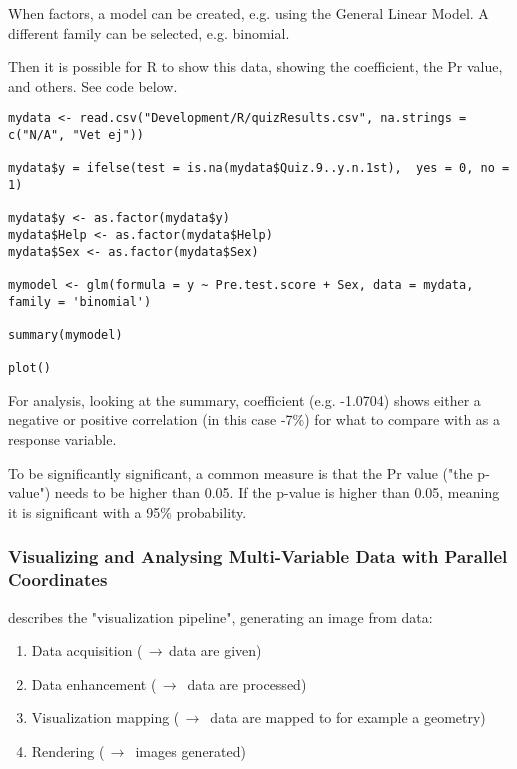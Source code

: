 When factors, a model can be created, e.g. using the General Linear Model. A different family can be selected, e.g. binomial.

Then it is possible for R to show this data, showing the coefficient, the Pr value, and others. See code below.

\begin{verbatim}
mydata <- read.csv("Development/R/quizResults.csv", na.strings = c("N/A", "Vet ej"))

mydata$y = ifelse(test = is.na(mydata$Quiz.9..y.n.1st),  yes = 0, no = 1)

mydata$y <- as.factor(mydata$y)
mydata$Help <- as.factor(mydata$Help)
mydata$Sex <- as.factor(mydata$Sex)

mymodel <- glm(formula = y ~ Pre.test.score + Sex, data = mydata, family = 'binomial')

summary(mymodel)

plot()
\end{verbatim}

For analysis, looking at the summary, coefficient (e.g. -1.0704) shows either a negative or positive correlation (in this case -7\%) for what to compare with as a response variable.

To be significantly significant, a common measure is that the Pr value ("the p-value") needs to be higher than 0.05. If the p-value is higher than 0.05, meaning it is significant with a 95\% probability.

\subsubsection{Visualizing and Analysing Multi-Variable Data with Parallel Coordinates}

\cite{timo-ropinski-liu} describes the "visualization pipeline", generating an image from data:

\begin{enumerate}
\item Data acquisition ($\,\to\,$data are given)
\item Data enhancement ($\,\to\,$ data are processed)
\item Visualization mapping ($\,\to\,$ data are mapped to for example a geometry)
\item Rendering ($\,\to\,$ images generated)
\end{enumerate}


